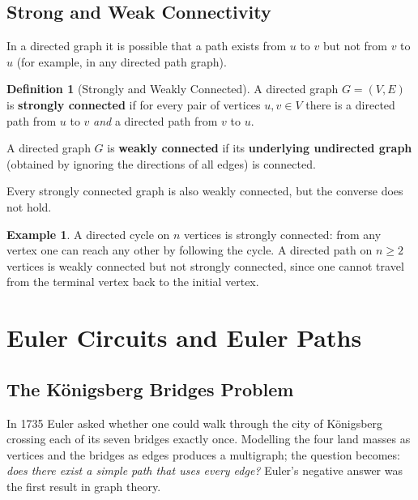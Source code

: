 \documentclass[11pt, a4paper, notitlepage]{report}
\theoremstyle{definition}
\newtheorem{definition}[theorem]{Definition}
\newtheorem{example}[theorem]{Example}
\theoremstyle{remark}
\begin{document}
\subsection{Strong and Weak Connectivity}
\label{subsec:strong-weak}

In a directed graph it is possible that a path exists from $u$ to $v$ but not from $v$ to $u$
(for example, in any directed path graph).

\begin{definition}[Strongly and Weakly Connected]
\label{def:strongly-weakly}
A directed graph $G = (V,E)$ is \textbf{strongly connected} if for every pair of vertices
$u, v \in V$ there is a directed path from $u$ to $v$ \emph{and} a directed path from $v$
to $u$.

A directed graph $G$ is \textbf{weakly connected} if its \textbf{underlying undirected graph}
(obtained by ignoring the directions of all edges) is connected.
\end{definition}

Every strongly connected graph is also weakly connected, but the converse does not hold.

\begin{example}
\label{ex:strong-weak}
A directed cycle on $n$ vertices is strongly connected: from any vertex one can reach any
other by following the cycle. A directed path on $n \ge 2$ vertices is weakly connected but
not strongly connected, since one cannot travel from the terminal vertex back to the initial
vertex.
\end{example}

\section{Euler Circuits and Euler Paths}
\label{sec:euler}

\subsection{The K\"{o}nigsberg Bridges Problem}
\label{subsec:konigsberg}

In 1735 Euler asked whether one could walk through the city of K\"{o}nigsberg crossing each
of its seven bridges exactly once. Modelling the four land masses as vertices and the bridges
as edges produces a multigraph; the question becomes: \emph{does there exist a simple path
that uses every edge?} Euler's negative answer was the first result in graph theory.
\end{document}
